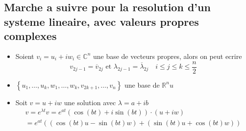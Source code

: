 \documentclass[../main.tex]{subfiles}
\begin{document}
\subsection*{Marche a suivre pour la resolution d'un systeme lineaire, avec valeurs propres complexes}
\begin{itemize}
\item Soient $v_i = u_i + i w_i \in \mathbb{C}^{n}$ une base de vecteurs propres, alors on peut ecrire
	\[ 
	v_{2j -1} = \overline{v}_{ 2j } \text{ et } \lambda_{2j -1} = \overline{\lambda}_{2j} \quad i \leq  j \leq  k \leq \frac{n}{2}
	\]

\item $ \left\{ u_1, \ldots, u_k , w_1, \ldots, w_k, v_{2k+1} ,\ldots, v_n \right\} $ une base de $ \mathbb{R}^nu$ 
\item Soit $v= u + iw$ une solution avec $\lambda = a + ib$ 
	\begin{align*}
	v = e^{\lambda t}  v = e^{at } ( \cos ( bt)  + i \sin(  bt) ) \cdot ( u+iw) \\
	= e^{at } \left( ( \cos ( bt) u - \sin ( bt) w  ) +( \sin( bt) u + \cos ( bt) w)   \right) 
	\end{align*}
	
	
\end{itemize}
\end{document}
